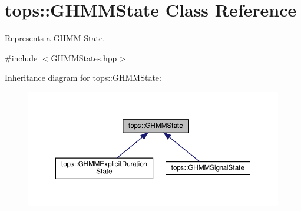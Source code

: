 \hypertarget{classtops_1_1GHMMState}{}\section{tops\+:\+:G\+H\+M\+M\+State Class Reference}
\label{classtops_1_1GHMMState}


Represents a G\+H\+MM State.  




{\ttfamily \#include $<$G\+H\+M\+M\+States.\+hpp$>$}



Inheritance diagram for tops\+:\+:G\+H\+M\+M\+State\+:
\nopagebreak
\begin{figure}[H]
\begin{center}
\leavevmode
\includegraphics[width=350pt]{classtops_1_1GHMMState__inherit__graph}
\end{center}
\end{figure}
